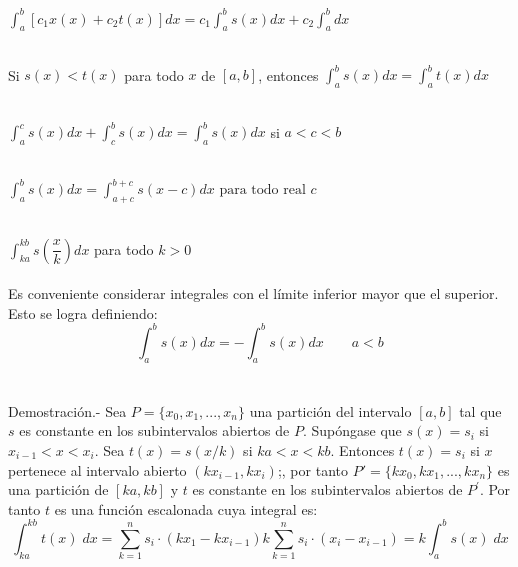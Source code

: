     \begin{teo}
	$\displaystyle\int_{a}^{b} [c_1x(x) + c_2t(x)] dx = c_1 \int_{a}^{b} s(x) dx + c_2 \int_{a}^{b} dx$\\\\
    \end{teo}

    \begin{teo} Si $s(x)<t(x)$ para todo $x$ de $[a,b]$, entonces $\displaystyle\int_{a}^{b} s(x) dx = \int_{a}^{b} t(x) dx$\\\\
    \end{teo}

    \begin{teo}
	$\displaystyle\int_{a}^{c} s(x) dx +  \int_{c}^{b} s(x) dx = \int_{a}^{b} s(x) dx$  si $a<c<b$ \\\\
    \end{teo}

    \begin{teo} 
	$\displaystyle\int_{a}^{b} s(x) dx = \int_{a+c}^{b+c} s(x-c) dx \mbox{ para todo real } c$\\\\
    \end{teo}

    \begin{teo}
	$\displaystyle\int_{ka}^{kb} s\left(\dfrac{x}{k}\right) dx$ para todo $k>0$\\\\
	Es conveniente considerar integrales con el límite inferior mayor que el superior. Esto se logra definiendo: $$\displaystyle\int_{a}^{b} s(x) dx = - \int_{a}^{b} s(x) dx \qquad a<b$$\\\\
	    Demostración.-\; Sea $P=\lbrace x_0,x_1,...,x_n \rbrace$ una partición del intervalo $[a,b]$ tal que $s$ es constante en los subintervalos abiertos de $P$. Supóngase que $s(x)=s_i$ si $x_{i-1}<x<x_i$. Sea $t(x)=s(x/k)$ si $ka<x<kb$. Entonces $t(x)=s_i$ si $x$ pertenece al intervalo abierto $(kx_{i-1},kx_i)$;, por tanto $P{'}=\lbrace kx_0,kx_1,...,kx_n \rbrace$ es una partición de $[ka,kb]$ y $t$ es constante en los subintervalos abiertos de $P^{'}$. Por tanto $t$ es una función escalonada cuya integral es: $$\displaystyle\int_{ka}^{kb} t(x) \; dx = \sum\limits_{k=1}^{n} s_i \cdot (kx_1 - kx_{i-1}) k\sum\limits_{k=1}^n s_i \cdot (x_i - x_{i-1}) = k \int_{a}^{b} s(x) \; dx$$\\
    \end{teo}

